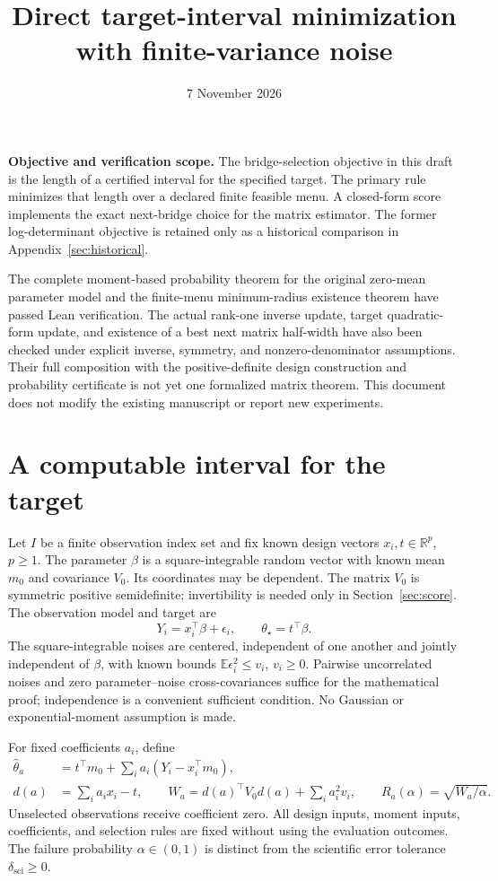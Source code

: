 \documentclass[11pt]{article}
\title{Direct target-interval minimization with finite-variance noise}
\author{}
\date{7 November 2026}
\theoremstyle{remark}
\newcommand{\R}{\mathbb R}
\newcommand{\E}{\mathbb E}
\newcommand{\sci}{\delta_{\mathrm{sci}}}
\begin{document}
\maketitle

\noindent\textbf{Objective and verification scope.}
The bridge-selection objective in this draft is the length of a certified interval for the specified target. The primary rule minimizes that length over a declared finite feasible menu. A closed-form score implements the exact next-bridge choice for the matrix estimator. The former log-determinant objective is retained only as a historical comparison in Appendix~\ref{sec:historical}.

The complete moment-based probability theorem for the original zero-mean parameter model and the finite-menu minimum-radius existence theorem have passed Lean verification. The actual rank-one inverse update, target quadratic-form update, and existence of a best next matrix half-width have also been checked under explicit inverse, symmetry, and nonzero-denominator assumptions. Their full composition with the positive-definite design construction and probability certificate is not yet one formalized matrix theorem. This document does not modify the existing manuscript or report new experiments.

\section{A computable interval for the target}
Let $I$ be a finite observation index set and fix known design vectors $x_i,t\in\R^p$, $p\ge1$. The parameter $\beta$ is a square-integrable random vector with known mean $m_0$ and covariance $V_0$. Its coordinates may be dependent. The matrix $V_0$ is symmetric positive semidefinite; invertibility is needed only in Section~\ref{sec:score}. The observation model and target are
\begin{equation}
 Y_i=x_i^\top\beta+\epsilon_i,\qquad \theta_\star=t^\top\beta.
 \label{eq:model}
\end{equation}
The square-integrable noises are centered, independent of one another and jointly independent of $\beta$, with known bounds $\E\epsilon_i^2\le v_i$, $v_i\ge0$. Pairwise uncorrelated noises and zero parameter--noise cross-covariances suffice for the mathematical proof; independence is a convenient sufficient condition. No Gaussian or exponential-moment assumption is made.

For fixed coefficients $a_i$, define
\begin{align}
 \widehat\theta_a
   &=t^\top m_0+\sum_i a_i(Y_i-x_i^\top m_0),\nonumber\\
 d(a)&=\sum_i a_ix_i-t,\qquad
 W_a=d(a)^\top V_0d(a)+\sum_i a_i^2v_i,\qquad
 R_a(\alpha)=\sqrt{W_a/\alpha}.                              \label{eq:radius}
\end{align}
Unselected observations receive coefficient zero. All design inputs, moment inputs, coefficients, and selection rules are fixed without using the evaluation outcomes. The failure probability $\alpha\in(0,1)$ is distinct from the scientific error tolerance $\sci\ge0$.
\end{document}
